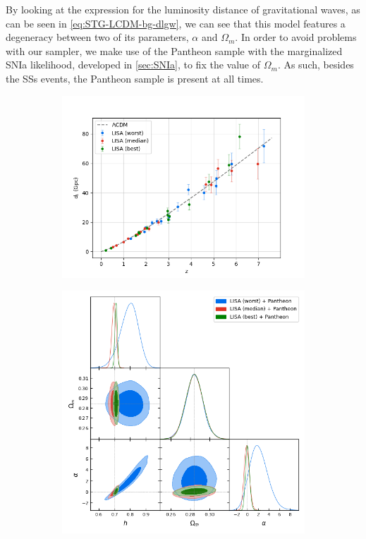 By looking at the expression for the luminosity distance of gravitational waves, as can be seen in \cref{eq:STG-LCDM-bg-dlgw}, we can see that this model features a degeneracy between two of its parameters, $\alpha$ and $\Omega_m$. In order to avoid problems with our sampler, we make use of the Pantheon sample with the marginalized \gls{SNIa} likelihood, developed in \cref{sec:SNIa}, to fix the value of $\Omega_m$. As such, besides the \glspl{SS} events, the Pantheon sample is present at all times.

\begin{figure}[h!]
    \centering
    \begin{subfigure}[t]{0.49\textwidth}
        \centering
        \includegraphics[width=\textwidth]{figures/LISA-9,10,12.png}
    \end{subfigure}
    \hfill
    \begin{subfigure}[t]{0.49\textwidth}
        \centering
        \includegraphics[width=\textwidth]{figures/fQ-LCDM-bg_LISA-9,10,12_pantheon-binned.png}

\end{subfigure}
\end{figure}

